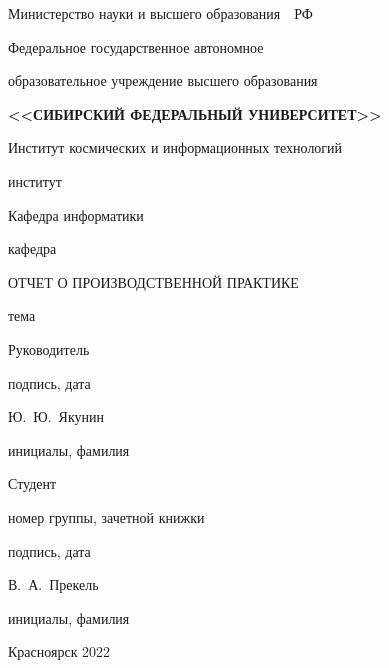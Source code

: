 \begingroup
\linespread{1}

\begin{centering}

    Министерство науки и высшего образования~~РФ

    \begin{small}

        Федеральное государственное автономное

        образовательное учреждение высшего образования

        \textbf{\MakeUppercase{<<Сибирский Федеральный Университет>>}}

    \end{small}
    \vspace{8pt}

    Институт космических и информационных технологий

    \vspace{-5pt}\begin{footnotesize}институт\end{footnotesize}

    Кафедра информатики

    \vspace{-5pt}\begin{footnotesize}кафедра\end{footnotesize}

    \vfill

    ОТЧЕТ О ПРОИЗВОДСТВЕННОЙ ПРАКТИКЕ

    \Topic

    тема

    \vfill

\end{centering}

Руководитель

подпись, дата

Ю.~Ю.~Якунин

инициалы, фамилия

Студент

номер группы, зачетной книжки

подпись, дата

В.~А.~Прекель

инициалы, фамилия

\centerline{Красноярск 2022}

\endgroup

\clearpage